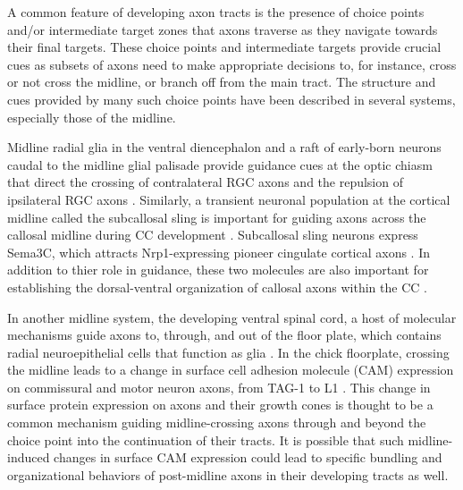 A common feature of developing axon tracts is the presence of choice points and/or intermediate target zones that axons traverse as they navigate towards their final targets.
These choice points and intermediate targets provide crucial cues as subsets of axons need to make appropriate decisions to, for instance, cross or not cross the midline, or branch off from the main tract.
The structure and cues provided by many such choice points have been described in several systems, especially those of the midline.

Midline radial glia in the ventral diencephalon and a raft of early-born neurons caudal to the midline glial palisade provide guidance cues at the optic chiasm \cite[reviewed in][]{erskine2014connecting,petros2008retinal} that direct the crossing of contralateral RGC axons \cite{charron2003morphogen,erskine2011vegf,kuwajima2012optic,williams2006role} and the repulsion of ipsilateral RGC axons \cite{williams2003ephrin,petros2010ephrin,petros2009specificity}. 
Similarly, a transient neuronal population at the cortical midline called the subcallosal sling is important for guiding axons across the callosal midline during CC development \cite{suarez2014evolution}. 
Subcallosal sling neurons express Sema3C, which attracts Nrp1-expressing pioneer cingulate cortical axons \cite{niquille2009transient,piper2009neuropilin}. 
In addition to thier role in guidance, these two molecules are also important for establishing the dorsal-ventral organization of callosal axons within the CC \cite{zhou2013axon}. 

In another midline system, the developing ventral spinal cord, a host of molecular mechanisms guide axons to, through, and out of the floor plate, which contains radial neuroepithelial cells that function as glia \cite[reviewed in][]{neuhaus2015crossing}.
In the chick floorplate, crossing the midline leads to a change in surface cell adhesion molecule (CAM) expression on commissural and motor neuron axons, from TAG-1 to L1 \cite{dodd1988spatial}. 
This change in surface protein expression on axons and their growth cones is thought to be a common mechanism guiding midline-crossing axons through and beyond the choice point into the continuation of their tracts.
It is possible that such midline-induced changes in surface CAM expression could lead to specific bundling and organizational behaviors of post-midline axons in their developing tracts as well.

